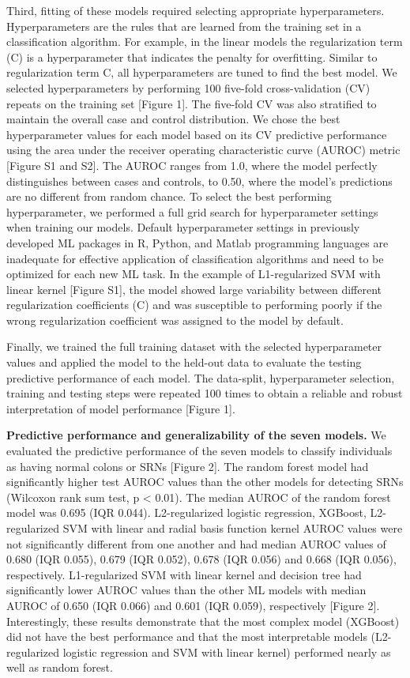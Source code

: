 \documentclass[11pt,]{article}
\begin{document}
Third, fitting of these models required selecting appropriate
hyperparameters. Hyperparameters are the rules that are learned from the
training set in a classification algorithm. For example, in the linear
models the regularization term (C) is a hyperparameter that indicates
the penalty for overfitting. Similar to regularization term C, all
hyperparameters are tuned to find the best model. We selected
hyperparameters by performing 100 five-fold cross-validation (CV)
repeats on the training set {[}Figure 1{]}. The five-fold CV was also
stratified to maintain the overall case and control distribution. We
chose the best hyperparameter values for each model based on its CV
predictive performance using the area under the receiver operating
characteristic curve (AUROC) metric {[}Figure S1 and S2{]}. The AUROC
ranges from 1.0, where the model perfectly distinguishes between cases
and controls, to 0.50, where the model's predictions are no different
from random chance. To select the best performing hyperparameter, we
performed a full grid search for hyperparameter settings when training
our models. Default hyperparameter settings in previously developed ML
packages in R, Python, and Matlab programming languages are inadequate
for effective application of classification algorithms and need to be
optimized for each new ML task. In the example of L1-regularized SVM
with linear kernel {[}Figure S1{]}, the model showed large variability
between different regularization coefficients (C) and was susceptible to
performing poorly if the wrong regularization coefficient was assigned
to the model by default.

Finally, we trained the full training dataset with the selected
hyperparameter values and applied the model to the held-out data to
evaluate the testing predictive performance of each model. The
data-split, hyperparameter selection, training and testing steps were
repeated 100 times to obtain a reliable and robust interpretation of
model performance {[}Figure 1{]}.

\textbf{Predictive performance and generalizability of the seven
models.} We evaluated the predictive performance of the seven models to
classify individuals as having normal colons or SRNs {[}Figure 2{]}. The
random forest model had significantly higher test AUROC values than the
other models for detecting SRNs (Wilcoxon rank sum test, p \textless{}
0.01). The median AUROC of the random forest model was 0.695 (IQR
0.044). L2-regularized logistic regression, XGBoost, L2-regularized SVM
with linear and radial basis function kernel AUROC values were not
significantly different from one another and had median AUROC values of
0.680 (IQR 0.055), 0.679 (IQR 0.052), 0.678 (IQR 0.056) and 0.668 (IQR
0.056), respectively. L1-regularized SVM with linear kernel and decision
tree had significantly lower AUROC values than the other ML models with
median AUROC of 0.650 (IQR 0.066) and 0.601 (IQR 0.059), respectively
{[}Figure 2{]}. Interestingly, these results demonstrate that the most
complex model (XGBoost) did not have the best performance and that the
most interpretable models (L2-regularized logistic regression and SVM
with linear kernel) performed nearly as well as random forest.
\end{document}
